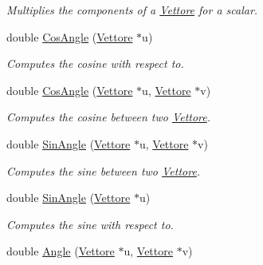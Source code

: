 \begin{DoxyCompactItemize}
\begin{DoxyCompactList}\small\item\em Multiplies the components of a \hyperlink{classVettore}{Vettore} for a scalar. \end{DoxyCompactList}\item 
double \hyperlink{classVettore_a907339d7b281d6d87abaea47a47bcd25}{Cos\+Angle} (\hyperlink{classVettore}{Vettore} $\ast$u)
\begin{DoxyCompactList}\small\item\em Computes the cosine with respect to. \end{DoxyCompactList}\item 
double \hyperlink{classVettore_a72f38f80c8b2ea4b6dcd00d66ec24451}{Cos\+Angle} (\hyperlink{classVettore}{Vettore} $\ast$u, \hyperlink{classVettore}{Vettore} $\ast$v)\hypertarget{classVettore_a72f38f80c8b2ea4b6dcd00d66ec24451}{}\label{classVettore_a72f38f80c8b2ea4b6dcd00d66ec24451}

\begin{DoxyCompactList}\small\item\em Computes the cosine between two \hyperlink{classVettore}{Vettore}. \end{DoxyCompactList}\item 
double \hyperlink{classVettore_a8d84edbdf1f76b3065cc1c3291b98669}{Sin\+Angle} (\hyperlink{classVettore}{Vettore} $\ast$u, \hyperlink{classVettore}{Vettore} $\ast$v)\hypertarget{classVettore_a8d84edbdf1f76b3065cc1c3291b98669}{}\label{classVettore_a8d84edbdf1f76b3065cc1c3291b98669}

\begin{DoxyCompactList}\small\item\em Computes the sine between two \hyperlink{classVettore}{Vettore}. \end{DoxyCompactList}\item 
double \hyperlink{classVettore_a46f89489dcb6933de9154c63c82f8b61}{Sin\+Angle} (\hyperlink{classVettore}{Vettore} $\ast$u)
\begin{DoxyCompactList}\small\item\em Computes the sine with respect to. \end{DoxyCompactList}\item 
double \hyperlink{classVettore_a936e4b859237ce1643e932504dde2f22}{Angle} (\hyperlink{classVettore}{Vettore} $\ast$u, \hyperlink{classVettore}{Vettore} $\ast$v)\hypertarget{classVettore_a936e4b859237ce1643e932504dde2f22}{}\label{classVettore_a936e4b859237ce1643e932504dde2f22}


\end{DoxyCompactItemize}
